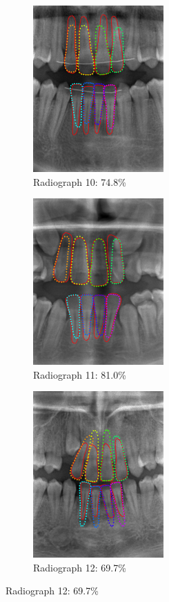 \documentclass[a4paper,10pt]{article}
\begin{document}
\begin{figure}
\captionsetup[subfigure]{labelformat=empty}
 \begin{subfigure}{.33\textwidth}
\centering
\includegraphics[width=50mm]{tooth_result_overlay_10.png}
\caption{Radiograph 10: 74.8\%}
\end{subfigure}%
\begin{subfigure}{.33\textwidth}
\centering
\includegraphics[width=50mm]{tooth_result_overlay_11.png}
\caption{Radiograph 11: 81.0\%}
\end{subfigure}%
\begin{subfigure}{.33\textwidth}
\centering
\includegraphics[width=50mm]{tooth_result_overlay_12.png}
\caption{Radiograph 12: 69.7\%}
\end{subfigure}%


\end{figure}
\end{document}
